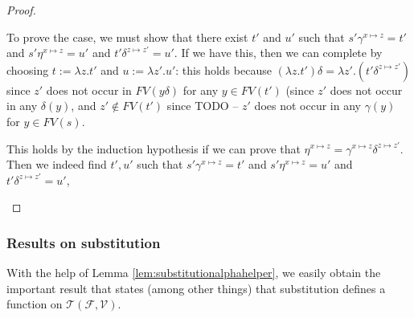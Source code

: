 \documentclass{lmcs}
\theoremstyle{theorem}\newtheorem{theorem}[dummy]{Theorem}
\theoremstyle{theorem}\newtheorem{lemma}[dummy]{Lemma}
\theoremstyle{theorem}\newtheorem{corollary}[dummy]{Corollary}
\theoremstyle{definition}\newtheorem{definition}[dummy]{Definition}
\theoremstyle{definition}\newtheorem{example}[dummy]{Example}
\newcommand{\F}{\mathcal{F}}
\newcommand{\V}{\mathcal{V}}
\newcommand{\Terms}{\mathcal{T}}
\newcommand{\FV}{\mathit{FV}}
\newcommand{\abs}[2]{\lambda #1.#2}
\begin{document}
\begin{proof}
\begin{itemize}
  To prove the case, we must show that there exist $t'$ and $u'$ such that
  $s'\gamma^{x\mapsto z} = t'$ and $s'\eta^{x\mapsto z} = u'$ and
  $t'\delta^{z \mapsto z'} = u'$.
  If we have this, then we can complete by choosing $t := \abs{z}{t'}$ and $u := \abs{z'}{u'}$:
  this holds because $(\abs{z}{t'})\delta = \abs{z'}{(t'\delta^{z \mapsto z'})}$ since $z'$ does
  not occur in $\FV(y\delta)$ for any $y \in \FV(t')$ (since $z'$ does not occur in any
  $\delta(y)$, and $z' \notin \FV(t')$ since TODO -- $z'$ does not occur in any $\gamma(y)$ for
  $y \in \FV(s)$.

  This holds by the induction hypothesis if we can prove that
  $\eta^{x \mapsto z} = \gamma^{x\mapsto z}\delta^{z\mapsto z'}$.
  Then we indeed find $t',u'$ such that $s'\gamma^{x\mapsto z} = t'$ and $s'\eta^{x\mapsto z} = u'$
  and $t'\delta^{z \mapsto z'} = u'$, 

%
\end{itemize}
\end{proof}

\subsubsection{Results on substitution}
With the help of Lemma \ref{lem:substitutionalphahelper}, we easily obtain the important result that
states (among other things) that substitution defines a function on $\Terms(\F,\V)$.
\end{document}
